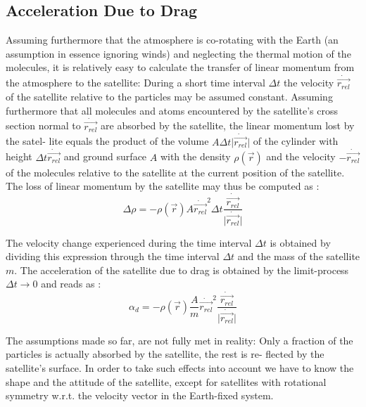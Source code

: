 \subsection{Acceleration Due to Drag}
\label{ssec:acceleration-due-to-drag}
Assuming furthermore that the
atmosphere is co-rotating with the Earth (an assumption in essence ignoring
winds) and neglecting the thermal motion of the molecules, it is relatively
easy to calculate the transfer of linear momentum from the atmosphere to the
satellite: During a short time interval \(\Delta t\) the velocity \(\dot{\vec{r_{rel}}}\) 
of the satellite relative to the particles may be assumed constant. Assuming furthermore that
all molecules and atoms encountered by the satellite's cross section normal 
to \(\dot{\vec{r_{rel}}}\) are absorbed by the satellite, the linear momentum lost by the satel-
lite equals the product of the volume \(A \Delta t \lvert \dot{\vec{r_{rel}}} \rvert \) 
of the cylinder with height \(\Delta t \dot{\vec{r_{rel}}} \)  and ground surface \(A\) 
with the density \(\rho(\vec{r})\) and the velocity \(- \dot{\vec{r_{rel}}} \) of the
molecules relative to the satellite at the current position of the satellite. The
loss of linear momentum by the satellite may thus be computed as \cite{BeutlerVII}:
\begin{equation}
    \Delta \rho = - \rho(\vec{r}) A {\dot{\vec{r_{rel}}}}^2 \Delta t 
    \frac{\dot{\vec{r_{rel}}}}{\lvert \dot{\vec{r_{rel}}} \rvert}
\end{equation}

The velocity change experienced during the time interval \(\Delta t\) is obtained by
dividing this expression through the time interval \(\Delta t\) and the mass of the
satellite \(m\). The acceleration of the satellite due to drag is obtained by
the limit-process \(\Delta t \to 0\) and reads as \cite{BeutlerVII}:
\begin{equation}
    \alpha_{d} = - \rho(\vec{r}) \frac{A}{m} {\dot{\vec{r_{rel}}}}^2 
    \frac{\dot{\vec{r_{rel}}}}{\lvert \dot{\vec{r_{rel}}} \rvert}
\end{equation}

The assumptions made so far, are not fully met in reality: Only a
fraction of the particles is actually absorbed by the satellite, the rest is re-
ﬂected by the satellite's surface. In order to take such eﬀects into account we
have to know the shape and the attitude of the satellite, except for satellites
with rotational symmetry w.r.t. the velocity vector in the Earth-ﬁxed system.

